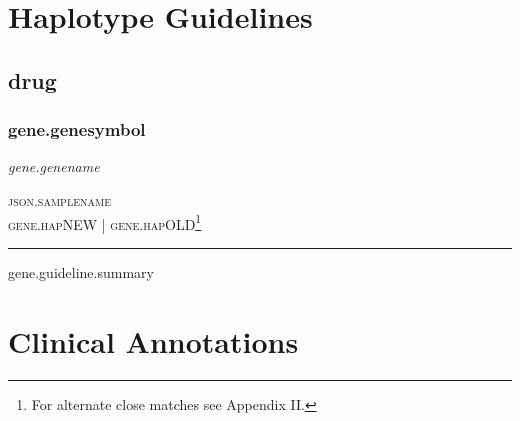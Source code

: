 \documentclass{report}
\begin{document}
\normalsize

\newpage

\section{Haplotype Guidelines}

{%

{%

\subsection{ {{drug}} }

{%

  {%
      \subsubsection{ {{gene.genesymbol}} }
     \textit{ {{gene.genename }} } \begin{flushright} \textsc{ {{json.samplename}} \\ {{gene.hapNEW}}  | {{gene.hapOLD}}\footnote{For alternate close matches see Appendix II.} }\end{flushright}
      \hrule \vspace{6pt}
      {{gene.guideline.summary}} \newline
      \scriptsize
      {%
      {%
      \newpage
      \normalsize
      {%
    {%
  {%
{%

\newpage

\section{Clinical Annotations}

{%

}}}}}}}}}}}
\end{document}
